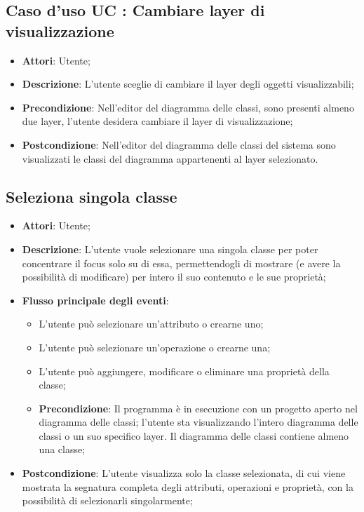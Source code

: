 \documentclass[../AnalisiDeiRequisiti.tex]{subfiles}
\begin{document}
		\subsection{Caso d'uso UC : Cambiare layer di visualizzazione}
			\begin{itemize}
				\item \textbf{Attori}: Utente;
				\item \textbf{Descrizione}: L'utente sceglie di cambiare il layer degli
				oggetti visualizzabili;
				\item \textbf{Precondizione}: Nell'editor del diagramma delle classi, sono
				presenti almeno due layer, l'utente desidera cambiare il layer di
				visualizzazione;
				\item \textbf{Postcondizione}: Nell'editor del diagramma delle classi del
				sistema sono visualizzati le classi del diagramma appartenenti al layer
				selezionato.
			\end{itemize}
		
				
	\subsection{Seleziona singola classe}
	\begin{itemize}
			\item \textbf{Attori}: Utente;
			\item \textbf{Descrizione}: L'utente vuole selezionare una singola classe per poter concentrare il focus solo su di essa, permettendogli di mostrare (e avere la possibilità di modificare) per intero il suo contenuto e le sue proprietà;
			\item \textbf{Flusso principale degli eventi}: 
		\begin{itemize}
			\item L'utente può selezionare un'attributo o crearne uno;
			\item L'utente può selezionare un'operazione o crearne una;
			\item L'utente può aggiungere, modificare o eliminare una proprietà della classe;
			\item \textbf{Precondizione}: Il programma è in esecuzione con un progetto aperto nel diagramma delle classi; l'utente sta visualizzando l'intero diagramma delle classi o un suo specifico layer. Il diagramma delle classi contiene almeno una classe;
		\end{itemize}
			\item \textbf{Postcondizione}: L'utente visualizza solo la classe selezionata, di cui viene mostrata la segnatura completa degli attributi, operazioni e proprietà, con la possibilità di selezionarli singolarmente;
	\end{itemize}
				
\end{document}
